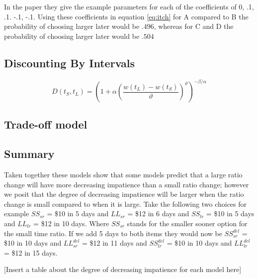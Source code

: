 \documentclass[]{article}
\begin{document}
In the paper they give the example parameters for each of the coefficients of 0, .1, .1. -.1, -.1. Using these coefficients in equation \ref{eq:itch} for A compared to B the probability of choosing larger later would be $.496$, whereas for C and D the probability of choosing larger later would be $.504$


\subsection{Discounting By Intervals}

\begin{equation}\label{eq:int}
	D(t_S, t_L) = \left(1 + \alpha \left(\frac{w(t_L) - w(t_S)}{\vartheta}\right)^{\vartheta}\right)^{-\beta/\alpha}
\end{equation}


\subsection{Trade-off model}


\subsection{Summary}
Taken together these models show that some models predict that a large ratio change will have more decreasing impatience than a small ratio change; however we posit that the degree of  decreasing impatience will be larger when the ratio change is small compared to when it is large.
Take the following two choices for example $SS_{sr}$ = \$10 in 5 days and $LL_{sr}$ = \$12 in 6 days and $SS_{lr}$ = \$10 in 5 days and $LL_{lr}$ = \$12 in 10 days. Where $SS_{sr}$ stands for the smaller sooner option for the small time ratio. 
If we add 5 days to both items they would now be $SS_{sr}^{del}$ = \$10 in 10 days and $LL_{sr}^{del}$ = \$12 in 11 days and $SS_{lr}^{del}$ = \$10 in 10 days and $LL_{lr}^{del}$ = \$12 in 15 days. 

[Insert a table about the degree of decreasing impatience for each model here]
\end{document}
